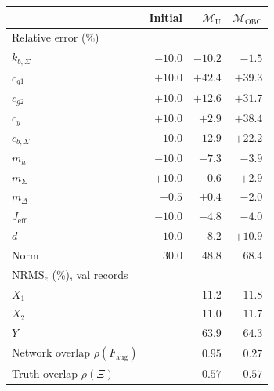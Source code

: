 \setlength{\tabcolsep}{4pt}
\begin{tabular}{l r r r}
\toprule
 & Initial & $\mathcal{M}_{\mathrm{U}}$ & $\mathcal{M}_{\mathrm{OBC}}$\\
\midrule
\multicolumn{4}{l}{Relative error (\%)}\\
$k_{b,\Sigma}$ & $-10.0$ & $-10.2$ & $-1.5$\\
$c_{g1}$ & $+10.0$ & $+42.4$ & $+39.3$\\
$c_{g2}$ & $+10.0$ & $+12.6$ & $+31.7$\\
$c_y$ & $+10.0$ & $+2.9$ & $+38.4$\\
$c_{b,\Sigma}$ & $-10.0$ & $-12.9$ & $+22.2$\\
$m_h$ & $-10.0$ & $-7.3$ & $-3.9$\\
$m_\Sigma$ & $+10.0$ & $-0.6$ & $+2.9$\\
$m_\Delta$ & $-0.5$ & $+0.4$ & $-2.0$\\
$J_{\mathrm{eff}}$ & $-10.0$ & $-4.8$ & $-4.0$\\
$d$ & $-10.0$ & $-8.2$ & $+10.9$\\
Norm & $30.0$ & $48.8$ & $68.4$\\
\midrule
\multicolumn{4}{l}{$\mathrm{NRMS}_e$ (\%), val records}\\
$X_1$ &  & $11.2$ & $11.8$\\
$X_2$ &  & $11.0$ & $11.7$\\
$Y$ &  & $63.9$ & $64.3$\\
\midrule
Network overlap $\rho(F_{\mathrm{aug}})$ &  & $0.95$ & $0.27$\\
Truth overlap $\rho(\Xi)$ &  & $0.57$ & $0.57$\\
\bottomrule
\end{tabular}
